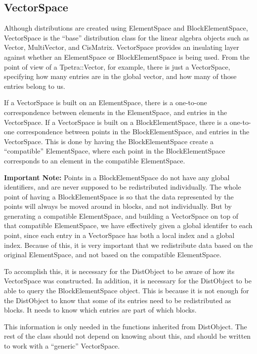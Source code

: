 \documentclass[10pt,relax]{TpetraDesign}
\begin{document}
%
\subsection{VectorSpace}
Although distributions are created using ElementSpace and BlockElementSpace, VectorSpace is the ``base'' distribution class for the linear algebra objects such as Vector, MultiVector, and CisMatrix. VectorSpace provides an insulating layer against whether an ElementSpace or BlockElementSpace is being used. From the point of view of a Tpetra::Vector, for example, there is just a VectorSpace, specifying how many entries are in the global vector, and how many of those entries belong to us.

If a VectorSpace is built on an ElementSpace, there is a one-to-one correspondence between elements in the ElementSpace, and entries in the VectorSpace. If a VectorSpace is built on a BlockElementSpace, there is a one-to-one correspondence between points in the BlockElementSpace, and entries in the VectorSpace. This is done by having the BlockElementSpace create a ``compatible'' ElementSpace, where each point in the BlockElementSpace corresponds to an element in the compatible ElementSpace.

\textbf{Important Note:} Points in a BlockElementSpace do not have any global identifiers, and are never supposed to be redistributed individually. The whole point of having a BlockElementSpace is so that the data represented by the points will always be moved around in blocks, and not individually. But by generating a compatible ElementSpace, and building a VectorSpace on top of that compatible ElementSpace, we have effectively given a global identifer to each point, since each entry in a VectorSpace has both a local index and a global index. Because of this, it is very important that we redistribute data based on the original ElementSpace, and not based on the compatible ElementSpace. 

To accomplish this, it is necessary for the DistObject to be aware of how its VectorSpace was constructed. In addition, it is necessary for the DistObject to be able to query the BlockElementSpace object. This is because it is not enough for the DistObject to know that some of its entries need to be redistributed as blocks. It needs to know which entries are part of which blocks.

This information is only needed in the functions inherited from DistObject. The rest of the class should not depend on knowing about this, and should be written to work with a ``generic'' VectorSpace.
\end{document}
